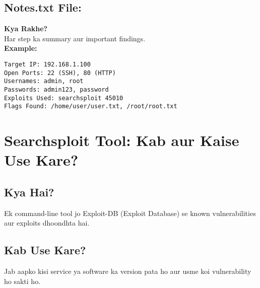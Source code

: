 \documentclass[a4paper]{article}
\begin{document}
\subsection{Notes.txt File:}
\textbf{Kya Rakhe?} \\
Har step ka summary aur important findings. \\
\textbf{Example:} \\
\begin{lstlisting}
Target IP: 192.168.1.100  
Open Ports: 22 (SSH), 80 (HTTP)  
Usernames: admin, root  
Passwords: admin123, password  
Exploits Used: searchsploit 45010  
Flags Found: /home/user/user.txt, /root/root.txt  
\end{lstlisting}

\section{Searchsploit Tool: Kab aur Kaise Use Kare?}
\subsection{Kya Hai?}
Ek command-line tool jo Exploit-DB (Exploit Database) se known vulnerabilities aur exploits dhoondhta hai.

\subsection{Kab Use Kare?}
Jab aapko kisi service ya software ka version pata ho aur usme koi vulnerability ho sakti ho.
\end{document}

